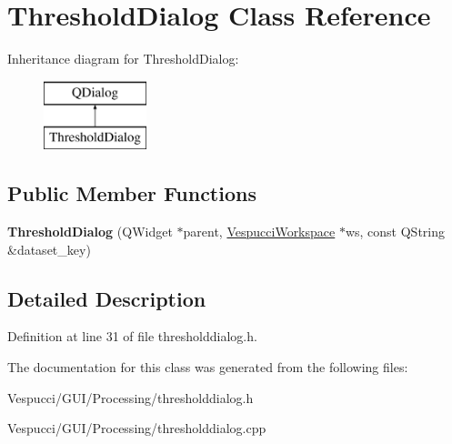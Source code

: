 \hypertarget{class_threshold_dialog}{}\section{Threshold\+Dialog Class Reference}
\label{class_threshold_dialog}
Inheritance diagram for Threshold\+Dialog\+:\begin{figure}[H]
\begin{center}
\leavevmode
\includegraphics[height=2.000000cm]{class_threshold_dialog}
\end{center}
\end{figure}
\subsection*{Public Member Functions}
\begin{DoxyCompactItemize}
\item 
{\bfseries Threshold\+Dialog} (Q\+Widget $\ast$parent, \hyperlink{class_vespucci_workspace}{Vespucci\+Workspace} $\ast$ws, const Q\+String \&dataset\+\_\+key)\hypertarget{class_threshold_dialog_a66feeb4d1136e0898e1721b20eda6ef1}{}\label{class_threshold_dialog_a66feeb4d1136e0898e1721b20eda6ef1}

\end{DoxyCompactItemize}


\subsection{Detailed Description}


Definition at line 31 of file thresholddialog.\+h.



The documentation for this class was generated from the following files\+:\begin{DoxyCompactItemize}
\item 
Vespucci/\+G\+U\+I/\+Processing/thresholddialog.\+h\item 
Vespucci/\+G\+U\+I/\+Processing/thresholddialog.\+cpp\end{DoxyCompactItemize}
